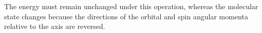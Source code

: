 The energy must remain unchanged under this operation, whereas the molecular state changes because the directions of the orbital and spin angular momenta relative to the axis are reversed.
